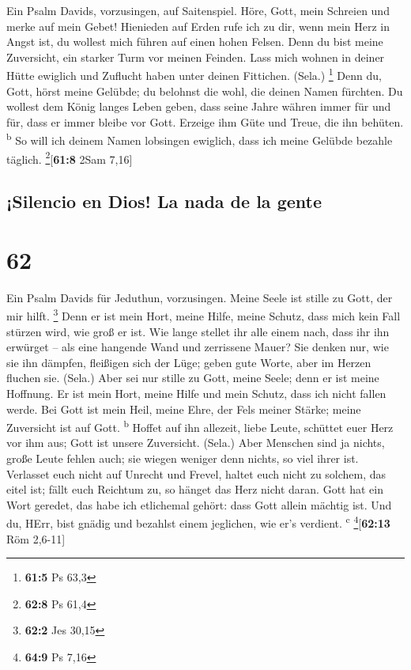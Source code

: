  Ein Psalm Davids, vorzusingen, auf Saitenspiel.
 Höre, Gott, mein Schreien und merke auf mein Gebet!
 Hienieden auf Erden rufe ich zu dir, wenn mein Herz in
Angst ist, du wollest mich führen auf einen hohen Felsen. 
Denn du bist meine Zuversicht, ein starker Turm vor meinen Feinden.
 Lass mich wohnen in deiner Hütte ewiglich und Zuflucht
haben unter deinen Fittichen. (Sela.) \footnote{\textbf{61:5} Ps 63,3}
 Denn du, Gott, hörst meine Gelübde; du belohnst die wohl,
die deinen Namen fürchten.  Du wollest dem König langes
Leben geben, dass seine Jahre währen immer für und für, 
dass er immer bleibe vor Gott. Erzeige ihm Güte und Treue, die ihn
behüten. \textsuperscript{b}  So will ich deinem Namen
lobsingen ewiglich, dass ich meine Gelübde bezahle täglich.
\footnote{\textbf{62:8} Ps 61,4}{[}\textbf{61:8} 2Sam 7,16{]}

\hypertarget{silencio-en-dios-la-nada-de-la-gente}{%
\subsection{¡Silencio en Dios! La nada de la
gente}\label{silencio-en-dios-la-nada-de-la-gente}}

\hypertarget{section-61}{%
\section{62}\label{section-61}}

 Ein Psalm Davids für Jeduthun, vorzusingen.
 Meine Seele ist stille zu Gott, der mir hilft.
\footnote{\textbf{62:2} Jes 30,15}  Denn er ist mein Hort,
meine Hilfe, meine Schutz, dass mich kein Fall stürzen wird, wie groß er
ist.  Wie lange stellet ihr alle einem nach, dass ihr ihn
erwürget -- als eine hangende Wand und zerrissene Mauer? 
Sie denken nur, wie sie ihn dämpfen, fleißigen sich der Lüge; geben gute
Worte, aber im Herzen fluchen sie. (Sela.)  Aber sei nur
stille zu Gott, meine Seele; denn er ist meine Hoffnung. 
Er ist mein Hort, meine Hilfe und mein Schutz, dass ich nicht fallen
werde.  Bei Gott ist mein Heil, meine Ehre, der Fels
meiner Stärke; meine Zuversicht ist auf Gott. \textsuperscript{b}
 Hoffet auf ihn allezeit, liebe Leute, schüttet euer Herz
vor ihm aus; Gott ist unsere Zuversicht. (Sela.)  Aber
Menschen sind ja nichts, große Leute fehlen auch; sie wiegen weniger
denn nichts, so viel ihrer ist.  Verlasset euch nicht auf
Unrecht und Frevel, haltet euch nicht zu solchem, das eitel ist; fällt
euch Reichtum zu, so hänget das Herz nicht daran.  Gott
hat ein Wort geredet, das habe ich etlichemal gehört: dass Gott allein
mächtig ist.  Und du, HErr, bist gnädig und bezahlst
einem jeglichen, wie er's verdient. \textsuperscript{c}
\footnote{\textbf{64:9} Ps 7,16}{[}\textbf{62:13} Röm 2,6-11{]}

